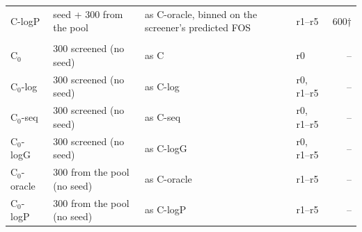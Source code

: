 \begin{table}[htbp]
\begin{tabular}{llllr}
C-logP & seed + 300 from the pool & \parbox[t]{4.6cm}{\raggedright as C-oracle, binned on the screener's predicted FOS\strut} & r1–r5 & 600† \\
\addlinespace
{} \\
C$_0$ & 300 screened (no seed) & \parbox[t]{4.6cm}{\raggedright as C\strut} & r0 & -- \\
C$_0$-log & 300 screened (no seed) & \parbox[t]{4.6cm}{\raggedright as C-log\strut} & r0, r1–r5 & -- \\
C$_0$-seq & 300 screened (no seed) & \parbox[t]{4.6cm}{\raggedright as C-seq\strut} & r0, r1–r5 & -- \\
C$_0$-logG & 300 screened (no seed) & \parbox[t]{4.6cm}{\raggedright as C-logG\strut} & r0, r1–r5 & -- \\
C$_0$-oracle & 300 from the pool (no seed) & \parbox[t]{4.6cm}{\raggedright as C-oracle\strut} & r1–r5 & -- \\
C$_0$-logP & 300 from the pool (no seed) & \parbox[t]{4.6cm}{\raggedright as C-logP\strut} & r1–r5 & -- \\
\bottomrule
\end{tabular}
\end{table}
